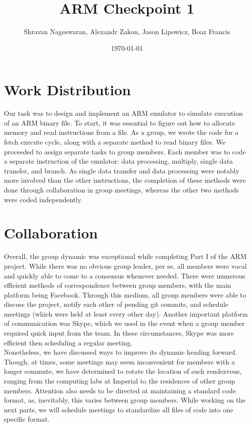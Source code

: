 \documentclass[11pt]{article}
\begin{document}
\title{\textbf{ARM Checkpoint 1}}
\author{Shravan Nageswaran, Alexandr Zakon, Jason Lipowicz, Boaz Francis}
\date{\today}

\maketitle

\vspace{0.2in}

\section{Work Distribution}

Our task was to design and implement an ARM emulator to simulate execution of an ARM binary file. To start, it was essential to figure out how to allocate memory and read instructions from a file. As a group, we wrote the code for a fetch execute cycle, along with a separate method to read binary files. We proceeded to assign separate tasks to group members. Each member was to code a separate instruction of the emulator: data processing, multiply, single data transfer, and branch. As single data transfer and data processing were notably more involved than the other instructions, the completion of these methods were done through collaboration in group meetings, whereas the other two methods were coded independently. 

\vspace{0.6in}

\section{Collaboration}

Overall, the group dynamic was exceptional while completing Part I of the ARM project. While there was no obvious group leader, per se, all members were vocal and quickly able to come to a consensus whenever needed. There were numerous efficient methods of correspondence between group members, with the main platform being Facebook. Through this medium, all group members were able to discuss the project, notify each other of pending git commits, and schedule meetings (which were held at least every other day). Another important platform of communication was Skype, which we used in the event when a group member required quick input from the team. In these circumstances, Skype was more efficient then scheduling a regular meeting.\\[0.2in] Nonetheless, we have discussed ways to improve its dynamic heading forward. Though, at times, some meetings may seem inconvenient for members with a longer commute, we have determined to rotate the location of such rendezvous, ranging from the computing labs at Imperial to the residences of other group members. Attention also needs to be directed at maintaining a standard code format, as, inevitably, this varies between group members. While working on the next parts, we will schedule meetings to standardize all files of code into one specific format.
\end{document}
